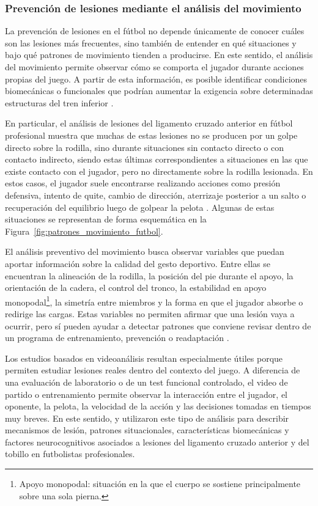 \subsubsection{Prevención de lesiones mediante el análisis del movimiento}

La prevención de lesiones en el fútbol no depende únicamente de conocer cuáles son las lesiones
más frecuentes, sino también de entender en qué situaciones y bajo qué patrones de movimiento
tienden a producirse. En este sentido, el análisis del movimiento permite observar cómo se
comporta el jugador durante acciones propias del juego. A partir de esta información, es posible
identificar condiciones biomecánicas o funcionales que podrían aumentar la exigencia sobre
determinadas estructuras del tren inferior \parencite{DellaVillaEtAl2020}.

En particular, el análisis de lesiones del ligamento cruzado anterior en fútbol profesional
muestra que muchas de estas lesiones no se producen por un golpe directo sobre la rodilla, sino
durante situaciones sin contacto directo o con contacto indirecto, siendo estas últimas
correspondientes a situaciones en las que existe contacto con el jugador, pero no directamente
sobre la rodilla lesionada. En estos casos, el jugador suele encontrarse realizando acciones como
presión defensiva, intento de quite, cambio de dirección, aterrizaje posterior a un salto o
recuperación del equilibrio luego de golpear la pelota \parencite{DellaVillaEtAl2020}. Algunas
de estas situaciones se representan de forma esquemática en la
Figura~\ref{fig:patrones_movimiento_futbol}.



El análisis preventivo del movimiento busca observar variables que puedan aportar información
sobre la calidad del gesto deportivo. Entre ellas se encuentran la alineación de la rodilla, la
posición del pie durante el apoyo, la orientación de la cadera, el control del tronco, la
estabilidad en apoyo monopodal\footnote{Apoyo monopodal: situación en la que el cuerpo se
sostiene principalmente sobre una sola pierna.}, la simetría entre miembros y la forma en que
el jugador absorbe o redirige las cargas. Estas variables no permiten afirmar que una lesión vaya
a ocurrir, pero sí pueden ayudar a detectar patrones que conviene revisar dentro de un programa
de entrenamiento, prevención o readaptación
\parencite{DellaVillaEtAl2020,BuckthorpeEtAl2024ACL}.

Los estudios basados en videoanálisis resultan especialmente útiles porque permiten estudiar
lesiones reales dentro del contexto del juego. A diferencia de una evaluación de laboratorio o
de un test funcional controlado, el video de partido o entrenamiento permite observar la
interacción entre el jugador, el oponente, la pelota, la velocidad de la acción y las decisiones
tomadas en tiempos muy breves. En este sentido, \textcite{BuckthorpeEtAl2024ACL} y
\textcite{BuckthorpeEtAl2025Ankle} utilizaron este tipo de análisis para describir mecanismos
de lesión, patrones situacionales, características biomecánicas y factores neurocognitivos
asociados a lesiones del ligamento cruzado anterior y del tobillo en futbolistas profesionales.


